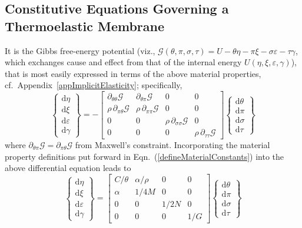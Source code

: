 \subsection{Constitutive Equations Governing a Thermoelastic Membrane}

It is the Gibbs free-energy potential (viz., $\mathcal{G} ( \theta , \pi , \sigma , \tau ) = U - \theta \eta - \pi \xi - \sigma \varepsilon - \tau \gamma$, which exchanges cause and effect from that of the internal energy $U ( \eta , \xi , \varepsilon , \gamma )$), that is most easily expressed in terms of the above material properties, cf.\ Appendix~\ref{appImplicitElasticity}; specifically,
\begin{displaymath}
\left\{ \begin{matrix}
\mathrm{d}\eta \\ \mathrm{d} \xi \\
\mathrm{d} \varepsilon \\ \mathrm{d} \gamma
\end{matrix} \right\} = -\begin{bmatrix}
\partial_{\theta\theta} \mathcal{G} & 
\partial_{\theta\pi} \mathcal{G} & 0 & 0 \\ 
\rho \, \partial_{\pi\theta} \mathcal{G} & 
\rho \, \partial_{\pi\pi} \mathcal{G} & 0 & 0 \\
0 & 0 & \rho \, \partial_{\sigma\sigma} \mathcal{G} & 0 \\
0 & 0 & 0 & \rho \, \partial_{\tau\tau} \mathcal{G}
\end{bmatrix} 
\left\{ \begin{matrix}
\mathrm{d} \theta \\ \mathrm{d} \pi \\
\mathrm{d} \sigma \\ \mathrm{d} \tau
\end{matrix} \right\} 
\end{displaymath}
where $\partial_{\theta\pi} \mathcal{G} = \partial_{\pi\theta} \mathcal{G}$ from Maxwell's constraint.  Incorporating the material property definitions put forward in Eqn.~(\ref{defineMaterialConstants}) into the above differential equation leads to
\begin{displaymath}
\label{GibbsMembrane}
\left\{ \begin{matrix}
\mathrm{d}\eta \\ \mathrm{d} \xi \\
\mathrm{d} \varepsilon \\ \mathrm{d} \gamma
\end{matrix} \right\} = \begin{bmatrix}
C / \theta & \alpha / \rho & 0 & 0 \\ 
\alpha & 1 / 4 M & 0 & 0 \\
0 & 0 & 1 / 2 N & 0 \\
0 & 0 & 0 & 1 / G
\end{bmatrix} 
\left\{ \begin{matrix}
\mathrm{d} \theta \\ \mathrm{d} \pi \\
\mathrm{d} \sigma \\ \mathrm{d} \tau
\end{matrix} \right\} 
\end{displaymath}
